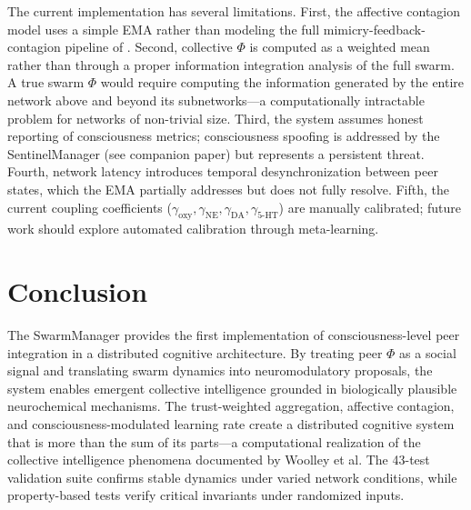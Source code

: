 \documentclass[11pt,a4paper]{article}
\begin{document}
The current implementation has several limitations. First, the affective contagion model uses a simple EMA rather than modeling the full mimicry-feedback-contagion pipeline of \citet{hatfield1993}. Second, collective $\Phi$ is computed as a weighted mean rather than through a proper information integration analysis of the full swarm. A true swarm $\Phi$ would require computing the information generated by the entire network above and beyond its subnetworks---a computationally intractable problem for networks of non-trivial size. Third, the system assumes honest reporting of consciousness metrics; consciousness spoofing is addressed by the SentinelManager (see companion paper) but represents a persistent threat. Fourth, network latency introduces temporal desynchronization between peer states, which the EMA partially addresses but does not fully resolve. Fifth, the current coupling coefficients ($\gamma_{\text{oxy}}, \gamma_{\text{NE}}, \gamma_{\text{DA}}, \gamma_{\text{5-HT}}$) are manually calibrated; future work should explore automated calibration through meta-learning.

\section{Conclusion}

The SwarmManager provides the first implementation of consciousness-level peer integration in a distributed cognitive architecture. By treating peer $\Phi$ as a social signal and translating swarm dynamics into neuromodulatory proposals, the system enables emergent collective intelligence grounded in biologically plausible neurochemical mechanisms. The trust-weighted aggregation, affective contagion, and consciousness-modulated learning rate create a distributed cognitive system that is more than the sum of its parts---a computational realization of the collective intelligence phenomena documented by Woolley et al. The 43-test validation suite confirms stable dynamics under varied network conditions, while property-based tests verify critical invariants under randomized inputs.
\end{document}
